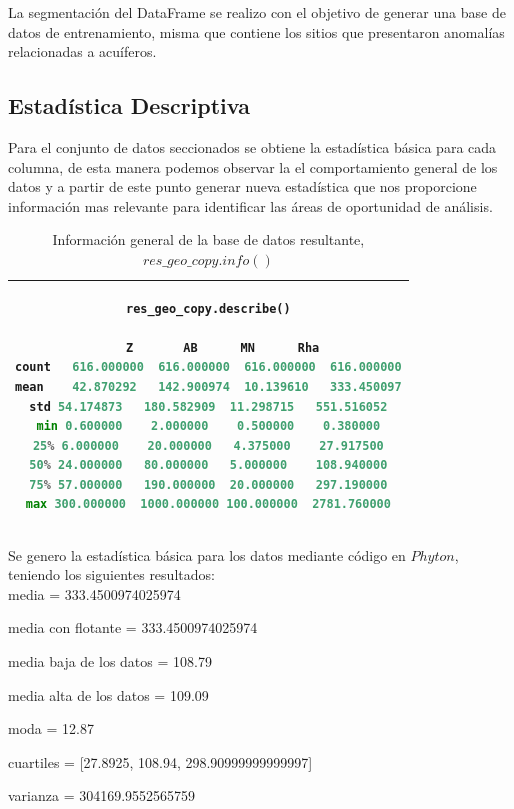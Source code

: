 \documentclass[sn-mathphys,Numbered]{sn-jnl}%
\theoremstyle{thmstyleone}%
\theoremstyle{thmstyletwo}%
\theoremstyle{thmstylethree}%
\begin{document}
La segmentación del DataFrame se realizo con el objetivo de generar una base de datos de entrenamiento, misma que contiene los sitios que presentaron anomalías relacionadas a acuíferos.


\subsection{Estadística Descriptiva}\label{subsec4}

Para el conjunto de datos seccionados se obtiene la estadística básica para cada columna, de esta manera podemos observar la el comportamiento general de los datos y a partir de este punto generar nueva estadística que nos proporcione información mas relevante para identificar las áreas de oportunidad de análisis.

\begin{table}[t]
	\begin{center}
	\begin{tabular}{|c|}
		\hline
{\small \begin{lstlisting}[language=python]
res_geo_copy.describe()

	Z		AB		MN		Rha
count	616.000000	616.000000	616.000000	616.000000
mean	42.870292	142.900974	10.139610	333.450097
std	54.174873	180.582909	11.298715	551.516052
min	0.600000	2.000000	0.500000	0.380000
25%	6.000000	20.000000	4.375000	27.917500
50%	24.000000	80.000000	5.000000	108.940000
75%	57.000000	190.000000	20.000000	297.190000
max	300.000000	1000.000000	100.000000	2781.760000
\end{lstlisting}}\\
	\hline
\end{tabular}
\caption{Información general de la base de datos resultante, $res\_geo\_copy.info()$}
\label{tab:.info}
\end{center}
\end{table}

Se genero la estadística básica para los datos mediante código en $Phyton$, teniendo los siguientes resultados:\\

media = 333.4500974025974

media con flotante = 333.4500974025974

media baja de los datos = 108.79

media alta de los datos = 109.09

moda = 12.87

cuartiles = [27.8925, 108.94, 298.90999999999997]

varianza = 304169.9552565759
\end{document}
